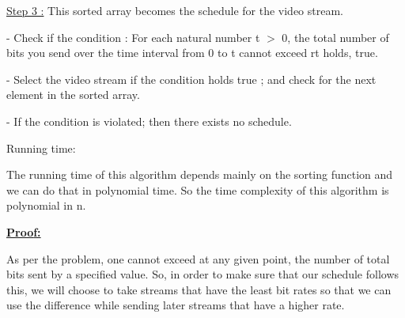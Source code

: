 \documentclass[letterpaper,portrait,12pt]{article}
\begin{document}
\begin{flushleft}
\uline{Step 3 :} This sorted array becomes the schedule for the video stream.
\end{flushleft}


- Check if the condition : For each natural number t $>$ 0, the total number of bits you send over the time interval from 0 to t cannot exceed rt holds, true.


\begin{flushleft}
- Select the video stream if the condition holds true ; and check for the next element in the sorted 	array.
\end{flushleft}


\begin{flushleft}
- If the condition is violated; then there exists no schedule.
\end{flushleft}


\begin{flushleft}

\end{flushleft}


\begin{flushleft}
Running time:
\end{flushleft}


\begin{flushleft}
	The running time of this algorithm depends mainly on the sorting function and we can do that in polynomial time. So the time complexity of this algorithm is polynomial in n. 
\end{flushleft}


\begin{flushleft}

\end{flushleft}


\begin{flushleft}
\textbf{\uline{Proo}}\textbf{\uline{f:}}
\end{flushleft}


\begin{flushleft}
 As per the problem, one cannot exceed at any given point, the number of total bits sent by a specified value. So, in order to make sure that our schedule follows this, we will choose to take streams that have the least bit rates so that we can use the difference while sending later streams that have a higher rate.
\end{flushleft}


\begin{flushleft}
\newpage

\end{flushleft}
\end{document}
